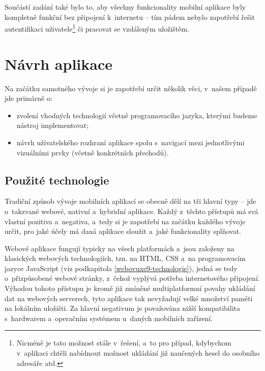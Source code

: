 Součástí zadání také bylo to, aby všechny funkcionality mobilní aplikace
byly kompletně funkční bez připojení k~internetu -- tím pádem nebylo
zapotřebí řešit autentifikaci
uživatele\footnote{Nicméně je tato možnost stále v~řešení, a~to pro případ, kdybychom v~aplikaci chtěli nabídnout možnost ukládání již naučených hesel do osobního adresáře atd.}
či pracovat se vzdáleným uložištěm.

\hypertarget{nuxe1vrh-aplikace}{%
\section{Návrh aplikace}\label{nuxe1vrh-aplikace}}

Na začátku samotného vývoje si je zapotřebí určit několik věci, v~našem
případě jde primárně o:

\begin{itemize}
\tightlist
\item
  zvolení vhodných technologií včetně programovacího jazyka, kterými
  budeme nástroj implementovat;
\item
  návrh uživatelského rozhraní aplikace spolu s~navigací mezi
  jednotlivými vizuálními prvky (včetně konkrétních přechodů).
\end{itemize}

\hypertarget{pouux17eituxe9-technologie}{%
\subsection{Použité technologie}\label{pouux17eituxe9-technologie}}

Tradiční způsob vývoje mobilních aplikací se obecně dělí na tři hlavní
typy -- jde o~takzvané webové, nativní a~hybridní aplikace. Každý
z~těchto přístupů má svá vlastní pozitiva a~negativa, a~tedy si je
zapotřebí na začátku každého vývoje určit, pro jaké účely má daná
aplikace sloužit a~jaké funkcionality splňovat.

Webové aplikace fungují typicky na všech platformách a~jsou založeny na
klasických webových technologiích, tzn. na HTML, CSS a~na programovacím
jazyce JavaScript (viz podkapitola \ref{webovuxe9-technologie}), jedná
se tedy o~přizpůsobené webové stránky, z~čehož vyplývá potřeba
internetového připojení. Výhodou tohoto přístupu je kromě již zmíněné
multiplatformní povahy ukládání dat na webových serverech, tyto aplikace
tak nevyžadují velké množství paměti na lokálním uložišti. Za hlavní
negativum je považována nižší kompatibilita s~hardwarem a~operačním
systémem u~daných mobilních zařízení.

